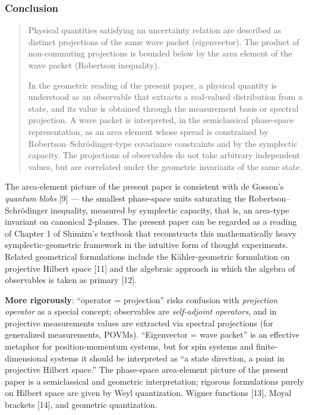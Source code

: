 \documentclass[
  11pt,
]{article}
\begin{document}
\subsubsection{Conclusion}\label{conclusion-4}

\begin{quote}
Physical quantities satisfying an uncertainty relation are described as
distinct projections of the same wave packet (eigenvector). The product
of non-commuting projections is bounded below by the area element of the
wave packet (Robertson inequality).

In the geometric reading of the present paper, a physical quantity is
understood as an observable that extracts a real-valued distribution
from a state, and its value is obtained through the measurement basis or
spectral projection. A wave packet is interpreted, in the semiclassical
phase-space representation, as an area element whose spread is
constrained by Robertson--Schrödinger-type covariance constraints and by
the symplectic capacity. The projections of observables do not take
arbitrary independent values, but are correlated under the geometric
invariants of the same state.
\end{quote}

The area-element picture of the present paper is consistent with de
Gosson's \emph{quantum blobs} {[}9{]} --- the smallest phase-space units
saturating the Robertson--Schrödinger inequality, measured by symplectic
capacity, that is, an area-type invariant on canonical 2-planes. The
present paper can be regarded as a reading of Chapter 1 of Shimizu's
textbook that reconstructs this mathematically heavy
symplectic-geometric framework in the intuitive form of thought
experiments. Related geometrical formulations include the
Kähler-geometric formulation on projective Hilbert space {[}11{]} and
the algebraic approach in which the algebra of observables is taken as
primary {[}12{]}.

\textbf{More rigorously}: ``operator = projection'' risks confusion with
\emph{projection operator} as a special concept; observables are
\emph{self-adjoint operators}, and in projective measurements values are
extracted via spectral projections (for generalized measurements,
POVMs). ``Eigenvector = wave packet'' is an effective metaphor for
position-momentum systems, but for spin systems and finite-dimensional
systems it should be interpreted as ``a state direction, a point in
projective Hilbert space.'' The phase-space area-element picture of the
present paper is a semiclassical and geometric interpretation; rigorous
formulations purely on Hilbert space are given by Weyl quantization,
Wigner functions {[}13{]}, Moyal brackets {[}14{]}, and geometric
quantization.
\end{document}
